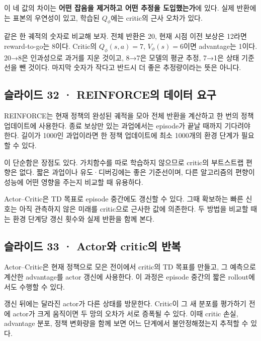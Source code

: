 \documentclass[11pt,a4paper]{article}
\begin{document}
이 네 값의 차이는 \textbf{어떤 잡음을 제거하고 어떤 추정을 도입했는가}에 있다. 실제 반환에는 표본의 우연성이 있고, 학습된 $Q_\phi$에는 critic의 근사 오차가 있다.\par

같은 한 궤적의 숫자로 비교해 보자. 전체 반환은 20, 현재 시점 이전 보상은 12라면 reward-to-go는 8이다. Critic의 $Q_\phi(s,a)=7$, $V_\phi(s)=6$이면 advantage는 1이다. 20→8은 인과성으로 과거를 지운 것이고, 8→7은 모델의 평균 추정, 7→1은 상태 기준선을 뺀 것이다. 마지막 숫자가 작다고 반드시 더 좋은 추정량이라는 뜻은 아니다.\par

\subsection{슬라이드 32 · REINFORCE의 데이터 요구}

REINFORCE는 현재 정책의 완성된 궤적을 모아 전체 반환을 계산하고 한 번의 정책 업데이트에 사용한다. 종료 보상만 있는 과업에서는 episode가 끝날 때까지 기다려야 한다. 길이가 1000인 과업이라면 한 정책 업데이트에 최소 1000개의 환경 단계가 필요할 수 있다.\par

이 단순함은 장점도 있다. 가치함수를 따로 학습하지 않으므로 critic의 부트스트랩 편향은 없다. 짧은 과업이나 유도·디버깅에는 좋은 기준선이며, 다른 알고리즘의 편향이 성능에 어떤 영향을 주는지 비교할 때 유용하다.\par

Actor–Critic은 TD 목표로 episode 중간에도 갱신할 수 있다. 그때 확보하는 빠른 신호는 아직 관측하지 않은 미래를 critic으로 근사한 값에 의존한다. 두 방법을 비교할 때는 환경 단계당 갱신 횟수와 실제 반환을 함께 본다.\par

\subsection{슬라이드 33 · Actor와 critic의 반복}

Actor–Critic은 현재 정책으로 모은 전이에서 critic의 TD 목표를 만들고, 그 예측으로 계산한 advantage를 actor 갱신에 사용한다. 이 과정은 episode 중간의 짧은 rollout에서도 수행할 수 있다.\par

갱신 뒤에는 달라진 actor가 다른 상태를 방문한다. Critic이 그 새 분포를 평가하기 전에 actor가 크게 움직이면 두 망의 오차가 서로 증폭될 수 있다. 이때 critic 손실, advantage 분포, 정책 변화량을 함께 보면 어느 단계에서 불안정해졌는지 추적할 수 있다.\par
\end{document}
